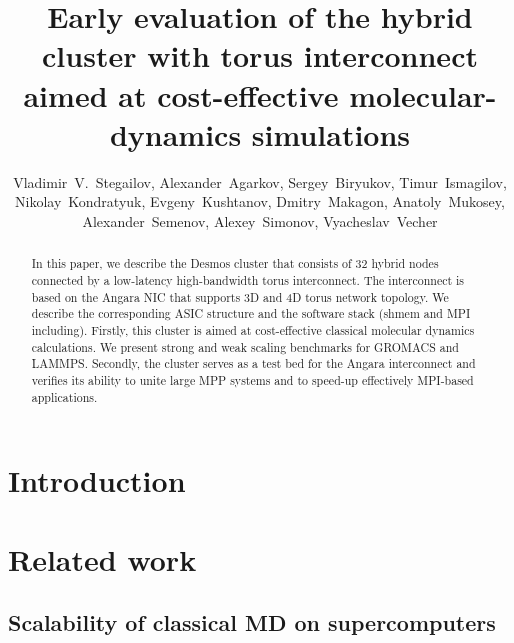 \documentclass{llncs}
\begin{document}
\title{Early evaluation of the hybrid cluster with torus interconnect aimed at cost-effective molecular-dynamics simulations}

\author{%
Vladimir~V.~Stegailov,
Alexander~Agarkov,
Sergey~Biryukov,
Timur~Ismagilov,
Nikolay~Kondratyuk,
Evgeny~Kushtanov,
Dmitry~Makagon,
Anatoly~Mukosey,
Alexander~Semenov,
Alexey~Simonov,
Vyacheslav~Vecher
}
%
%

\maketitle

\begin{abstract}
In this paper, we describe the Desmos cluster that consists of 32 hybrid nodes connected by a low-latency high-bandwidth torus interconnect. The interconnect is based on the Angara NIC that supports 3D and 4D torus network topology. We describe the corresponding ASIC structure and the software stack (shmem and MPI including). Firstly, this cluster is aimed at cost-effective classical molecular dynamics calculations. We present strong and weak scaling benchmarks for GROMACS and LAMMPS. Secondly, the cluster serves as a test bed for the Angara interconnect and verifies its ability to unite large MPP systems and to speed-up effectively MPI-based applications.
\end{abstract}


\section{Introduction}


\section{Related work}

\subsection{Scalability of classical MD on supercomputers}
\end{document}
